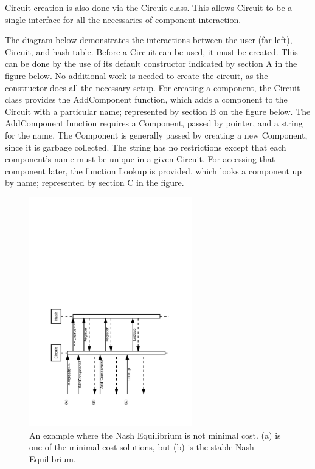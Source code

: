 \documentclass{article}
\begin{document}
Circuit creation is also done via the Circuit class. This allows Circuit to be a single interface for all the necessaries of component interaction.

The diagram below demonstrates the interactions between the user (far left), Circuit, and hash table. Before a Circuit can be used, it must be created. This can be done by the use of its default constructor indicated by section A in the figure below. No additional work is needed to create the circuit, as the constructor does all the necessary setup. For creating a component, the Circuit class provides the AddComponent function, which adds a component to the Circuit with a particular name; represented by section B on the figure below. The AddComponent function requires a Component, passed by pointer, and a string for the name. The Component is generally passed by creating a new Component, since it is garbage collected. The string has no restrictions except that each component’s name must be unique in a given Circuit. For accessing that component later, the function Lookup is provided, which looks a component up by name; represented by section C in the figure.

\begin{figure}[H]
    \begin{center}
        \includegraphics[angle=270,width=200pt]{imgs/ComponentCreationInteraction.pdf}
    \end{center}
    \caption{An example where the Nash Equilibrium is not minimal cost.
        (a) is one of the minimal cost solutions, but (b) is the stable Nash
        Equilibrium.}
\end{figure}
\end{document}
